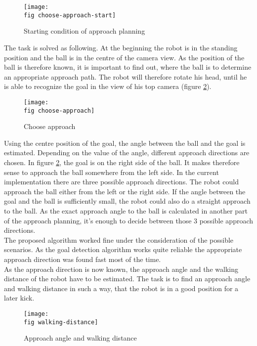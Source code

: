 \begin{figure}[ht]
	\texttt{[image: \\fig choose-approach-start]}
	\caption{Starting condition of approach planning}
	\label{j figure starting condition choose-approach}
\end{figure}

The task is solved as following. At the beginning the robot is in the standing position and the ball is in the centre of the camera view. As the position of the ball is therefore known, it is important to find out, where the ball is to determine an appropriate approach path. The robot will therefore rotate his head, until he is able to recognize the goal in the view of his top camera (figure \ref{j figure choose-approach}).

\begin{figure}[ht]
	\texttt{[image: \\fig choose-approach]}
	\caption{Choose approach}
	\label{j figure choose-approach}
\end{figure}

Using the centre position of the goal, the angle between the ball and the goal is estimated. Depending on the value of the angle, different approach directions are chosen. In figure \ref{j figure choose-approach}, the goal is on the right side of the ball. It makes therefore sense to approach the ball somewhere from the left side. In the current implementation there are three possible approach directions. The robot could approach the ball either from the left or the right side. If the angle between the goal and the ball is sufficiently small, the robot could also do a straight approach to the ball. As the exact approach angle to the ball is calculated in another part of the approach planning, it's enough to decide between those 3 possible approach directions.\\
The proposed algorithm worked fine under the consideration of the possible scenarios. As the goal detection algorithm works quite reliable the appropriate approach direction was found fast most of the time.\\
As the approach direction is now known, the approach angle and the walking distance of the robot have to be estimated. The task is to find an approach angle and walking distance in such a way, that the robot is in a good position for a later kick.

\begin{figure}[ht]
	\texttt{[image: \\fig walking-distance]}
	\caption{Approach angle and walking distance}
	\label{j figure approach angle and walking distance}
\end{figure}

